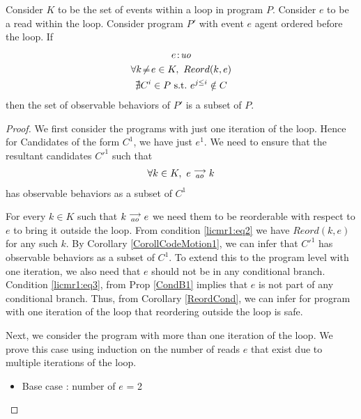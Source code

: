\begin{corollary}
    \label{LoopInvCodeMotRead1}
    Consider $K$ to be the set of events within a loop in program $P$. 
    Consider $e$ to be a read within the loop. Consider program $P'$ with event $e$ agent ordered before the loop. 
    If
    \begin{gather}
        e\!:\!\textit{uo} \label{licmr1:eq1}\\
        \forall k\!\neq\!e \in K, \ Reord(k, e) \label{licmr1:eq2}\\ 
        \nexists C^i \in P \ \text{s.t.} \ e^{j \leq i} \notin C  \label{licmr1:eq3}                    
    \end{gather}
    then the set of observable behaviors of $P'$ is a subset of $P$.
\end{corollary}

\begin{proof}

    We first consider the programs with just one iteration of the loop. 
    Hence for Candidates of the form $C^1$, we have just $e^1$. 
    We need to ensure that the resultant candidates $C'^1$ such that 
    \begin{align*}
        \forall k \in K, \ e\stackrel{\longrightarrow}{_{ao}}k
    \end{align*}  
    has observable behaviors as a subset of $C^1$

    For every $k \in K$ such that $k\stackrel{\longrightarrow}{_{ao}}e$ we need them to be reorderable with respect to $e$ to bring it outside the loop.
    From condition \ref{licmr1:eq2} we have $Reord(k,e)$ for any such $k$.
    By Corollary \ref{CorollCodeMotion1}, we can infer that $C'^1$ has observable behaviors as a subset of $C^1$.
    To extend this to the program level with one iteration, we also need that $e$ should not be in any conditional branch.
    Condition \ref{licmr1:eq3}, from Prop \ref{CondB1} implies that $e$ is not part of any conditional branch.
    Thus, from Corollary \ref{ReordCond}, we can infer for program with one iteration of the loop that reordering outside the loop is safe.  
    
    Next, we consider the program with more than one iteration of the loop. 
    We prove this case using induction on the number of reads $e$ that exist due to multiple iterations of the loop. 

    \begin{itemize}

        \item Base case : number of $e$ = 2
    

\end{itemize}
\end{proof}
